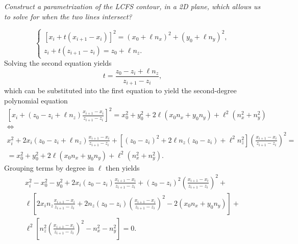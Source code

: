 \documentclass{notes}
\begin{document}
	\emph{Construct a parametrization of the LCFS contour, in a 2D plane, which
		allows us to solve for when the two lines intersect?}
	
	\begin{equation}
		\begin{cases}
			\left[x_i + t\left(x_{i+1}-x_i\right)\right]^2 =
				\left(x_0+\ell n_x\right)^2 + \left(y_0+\ell n_y\right)^2,\\
			z_i + t\left(z_{i+1}-z_i\right) =
				z_0 + \ell n_z.
		\end{cases}
	\end{equation}
	Solving the second equation yields
	\begin{equation}\label{eq:t}
		t = \frac{z_0-z_i + \ell n_z}{z_{i+1}-z_i},
	\end{equation}
	which can be substituted into the first equation to yield the second-degree
	polynomial equation
	\begin{equation}
		\begin{gathered}
			\left[
				x_i + \left(z_0-z_i+\ell n_z\right)\frac{x_{i+1}-x_i}{z_{i+1}-z_i}
			\right]^2 =
			x_0^2+y_0^2 + 2\ell\left(x_0n_x + y_0n_y\right) + \ell^2\left(n_x^2+n_y^2\right)\\
			\Longleftrightarrow\\
			x_i^2 +
			2x_i\left(z_0-z_i+\ell n_z\right)\frac{x_{i+1}-x_i}{z_{i+1}-z_i} +
			\left[\left(z_0-z_i\right)^2 + 2\ell n_z\left(z_0-z_i\right) + \ell^2n_z^2\right]
			\left(
				\frac{x_{i+1}-x_i}{z_{i+1}-z_i}
			\right)^2
			=\\
			=
			x_0^2+y_0^2 + 2\ell\left(x_0n_x + y_0n_y\right) + \ell^2\left(n_x^2+n_y^2\right).
		\end{gathered}
	\end{equation}
	Grouping terms by degree in $\ell$ then yields
	\begin{equation}
		\begin{gathered}
			x_i^2 - x_0^2 - y_0^2 +
			2x_i\left(z_0-z_i\right)\frac{x_{i+1}-x_i}{z_{i+1}-z_i} +
			\left(z_0-z_i\right)^2\left(\frac{x_{i+1}-x_i}{z_{i+1}-z_i}\right)^2 +\\
			\ell\left[
				2x_in_z\frac{x_{i+1}-x_i}{z_{i+1}-z_i} +
				2n_z\left(z_0-z_i\right)\left(
					\frac{x_{i+1}-x_i}{z_{i+1}-z_i}
				\right)^2 -
				2\left(x_0n_x + y_0n_y\right)
			\right] +\\
			\ell^2\left[
				n_z^2\left(
					\frac{x_{i+1}-x_i}{z_{i+1}-z_i}
				\right)^2 -
				n_x^2 - n_y^2
			\right] = 0.
		\end{gathered}
	\end{equation}
\end{document}
